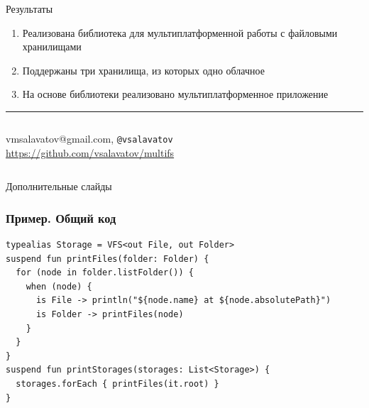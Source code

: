 \documentclass[14pt,aspectratio=169,hyperref={pdftex,unicode},xcolor=dvipsnames]{beamer}
\begin{document}
\begin{frame}{Результаты}
  \begin{enumerate}
  \item Реализована библиотека для мультиплатформенной работы с файловыми хранилищами
  \item Поддержаны три хранилища, из которых одно облачное
  \item На основе библиотеки реализовано мультиплатформенное приложение
  \end{enumerate}

  \vspace{2mm}\hrule\vspace{1mm}
    \begin{columns}
      \begin{center}
       vmsalavatov@gmail.com, \texttt{@vsalavatov} \\ 
        \url{https://github.com/vsalavatov/multifs}
      \end{center}
      
      \begin{center}
      \end{center}
    \end{columns}  
  
\end{frame}



\setcounter{finalframe}{\value{framenumber}}

\begin{frame}
  \begin{center}
  Дополнительные слайды
  \end{center}
\end{frame}


\begin{frame}[fragile]
\frametitle{Пример. Общий код}
\begin{verbatim}
typealias Storage = VFS<out File, out Folder>
suspend fun printFiles(folder: Folder) {
  for (node in folder.listFolder()) {
    when (node) {
      is File -> println("${node.name} at ${node.absolutePath}")
      is Folder -> printFiles(node)
    }
  }
}
suspend fun printStorages(storages: List<Storage>) {
  storages.forEach { printFiles(it.root) }
}
\end{verbatim}
\end{frame}
\end{document}
